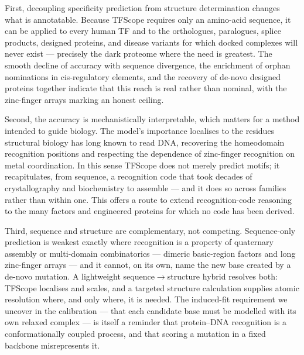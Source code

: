 \documentclass[11pt,letterpaper]{article}
\begin{document}
First, decoupling specificity prediction from structure determination changes what is annotatable.
Because TFScope requires only an amino-acid sequence, it can be applied to every human TF and to
the orthologues, paralogues, splice products, designed proteins, and disease variants for which
docked complexes will never exist --- precisely the dark proteome where the need is greatest. The
smooth decline of accuracy with sequence divergence, the enrichment of orphan nominations in
cis-regulatory elements, and the recovery of de-novo designed proteins together indicate that this
reach is real rather than nominal, with the zinc-finger arrays marking an honest ceiling.

Second, the accuracy is mechanistically interpretable, which matters for a method intended to guide
biology. The model's importance localises to the residues structural biology has long known to read
DNA, recovering the homeodomain recognition positions and respecting the dependence of zinc-finger
recognition on metal coordination. In this sense TFScope does not merely predict motifs; it
recapitulates, from sequence, a recognition code that took decades of crystallography and
biochemistry to assemble --- and it does so across families rather than within one. This offers a
route to extend recognition-code reasoning to the many factors and engineered proteins for which no
code has been derived.

Third, sequence and structure are complementary, not competing. Sequence-only prediction is
weakest exactly where recognition is a property of quaternary assembly or multi-domain
combinatorics --- dimeric basic-region factors and long zinc-finger arrays --- and it cannot, on its
own, name the new base created by a de-novo mutation. A lightweight sequence$\to$structure hybrid
resolves both: TFScope localises and scales, and a targeted structure calculation supplies atomic
resolution where, and only where, it is needed. The induced-fit requirement we uncover in the
calibration --- that each candidate base must be modelled with its own relaxed complex --- is itself
a reminder that protein--DNA recognition is a conformationally coupled process, and that scoring a
mutation in a fixed backbone misrepresents it.
\end{document}
